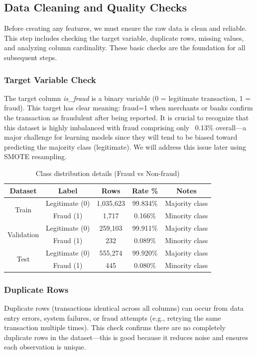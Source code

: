 \subsection{Data Cleaning and Quality Checks}

Before creating any features, we must ensure the raw data is clean and reliable. This step includes checking the target variable, duplicate rows, missing values, and analyzing column cardinality. These basic checks are the foundation for all subsequent steps.

\subsubsection{Target Variable Check}
The target column \textit{is\_fraud} is a binary variable (0 = legitimate transaction, 1 = fraud). This target has clear meaning: fraud=1 when merchants or banks confirm the transaction as fraudulent after being reported. It is crucial to recognize that this dataset is highly imbalanced with fraud comprising only ~0.13\% overall---a major challenge for learning models since they will tend to be biased toward predicting the majority class (legitimate). We will address this issue later using SMOTE resampling.

\begin{table}[H]
\centering
\caption{Class distribution details (Fraud vs Non-fraud)}
\small
\begin{tabular}{|c|c|c|c|c|}
\hline
\textbf{Dataset} & \textbf{Label} & \textbf{Rows} & \textbf{Rate \%} & \textbf{Notes} \\
\hline
\multirow{2}{*}{Train} & Legitimate (0) & 1,035,623 & 99.834\% & Majority class \\
\cline{2-5}
 & Fraud (1) & 1,717 & 0.166\% & Minority class \\
\hline
\multirow{2}{*}{Validation} & Legitimate (0) & 259,103 & 99.911\% & Majority class \\
\cline{2-5}
 & Fraud (1) & 232 & 0.089\% & Minority class \\
\hline
\multirow{2}{*}{Test} & Legitimate (0) & 555,274 & 99.920\% & Majority class \\
\cline{2-5}
 & Fraud (1) & 445 & 0.080\% & Minority class \\
\hline
\end{tabular}
\end{table}

\subsubsection{Duplicate Rows}
Duplicate rows (transactions identical across all columns) can occur from data entry errors, system failures, or fraud attempts (e.g., retrying the same transaction multiple times). This check confirms there are no completely duplicate rows in the dataset---this is good because it reduces noise and ensures each observation is unique.

